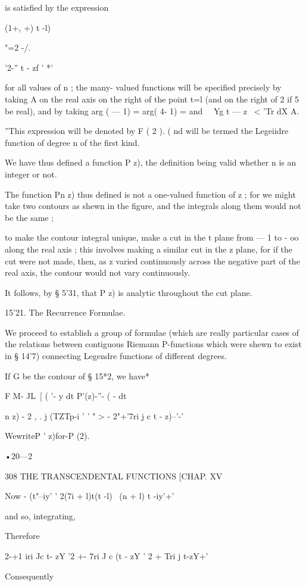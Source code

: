 {is satisfied hy the expression

(1+, +) t -l)

"=2 -/.

  '2-'' t - zf ' *'

for all values of n ; the many- valued functions will be specified
precisely by taking A on the real axis on the right of the point t=l
(and on the right of 2 if 5 be real), and by taking arg ( — 1) = arg(
4- 1) = and \ \ Yg t — z \ < 'Tr dX A.

''This expression will be denoted by F ( 2 ). ( nd will be termed the
Legeiidre function of degree n of the first kind.

We have thus defined a function P z), the definition being valid
whether n is an integer or not.

The function Pn z) thus defined is not a one-valued function of z ;
for we might take two contours as shewn in the figure, and the
integrals along them would not be the same ;

to make the contour integral unique, make a cut in the t plane from —
1 to - oo along the real axis ; this involves making a similar cut in
the z plane, for if the cut were not made, then, as z varied
continuously across the negative part of the real axis, the contour
would not vary continuously.

It follows, by § 5'31, that P z) is analytic throughout the cut plane.

15'21. The Recurrence Formulae.

We proceed to establish a group of formulae (which are really
particular cases of the relations between contiguous Riemann
P-functions which were shewn to exist in § 14'7) connecting Legendre
functions of different degrees.

If G be the contour of § 15*2, we have*

F M- JL\ [ ( '- y dt P'(z)-''- ( - dt

 n z) - 2 , . j (TZTp-i ' ' " > - 2"+'7ri j c t - z)--'-'

WewriteP ' z)for-P (2).

•20—2

308 THE TRANSCENDENTAL FUNCTIONS [CHAP. XV

Now - (t"--iy' ' 2(7i + l)t(t -l) \ (n + l) t -iy'+'

and so, integrating,

Therefore

2-+1 iri Jc t- zY '2 +- 7ri J c (t - zY ' 2 + Tri j t-zY+'

Consequently

}
